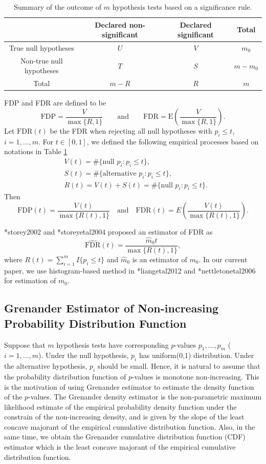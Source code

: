 \documentclass[12pt, letter]{article}\usepackage[]{graphicx}\usepackage[]{color}
\begin{document}
\begin{table}
\centering
\begin{tabular}{|c|cc|c|}
\hline
& Declared non-significant   & Declared significant & Total \\
\hline
True null hypotheses & $U$ & $V$ & $m_0$\\
Non-true null hypotheses & $T$ & $S$ & $m - m_0$\\
\hline
Total & $m-R$ & $R$ & $m$\\
\hline
\end{tabular}
\caption{Summary of the outcome of $m$ hypothesis tests based on a significance rule.}
\label{tab:t1}
\end{table}
FDP and FDR are defined to be
\[
\mbox{FDP} =\frac{V}{\max\{R,1\}}\qquad \mbox{and} \qquad   \mbox{FDR} =\mbox{E}\left(\frac{V}{\max\{R,1\}} \right).
\]
Let $\mbox{FDR}(t)$ be the FDR when rejecting all null hypotheses with $p_i \leq t$,  $i = 1, \dots, m$. For $t\in [0,1]$, we  defined the following empirical processes based on notations in Table \ref{tab:t1}
\begin{align*}
& V(t) = \#\{\mbox{null } p_i : p_i \leq t\},\\
& S(t) = \#\{\mbox{alternative } p_i : p_i \leq t\},\\
& R(t) = V(t) + S(t) =  \#\{\mbox{null } p_i : p_i \leq t\}.
\end{align*}
Then 
\[
\mbox{FDP}(t) = \frac{V(t)}{\max\{R(t), 1\}} \quad \mbox{and} \quad \mbox{FDR}(t) = E\left(\frac{V(t)}{\max\{R(t), 1\}}\right).
\]

\citeasnoun**{storey2002} and \citeasnoun**{storeyetal2004} proposed an estimator of FDR as 
\[
\widehat{\mbox{FDR}}(t) = \frac{\hat{m}_0 t}{\max\{R(t), 1\}},
\]
where $R(t) = \sum_{i = 1}^m I\{p_i \leq t\}$  and $\hat{m}_0$ is an estimator of $m_0$. In our current paper, we use histogram-based method in \citeasnoun**{liangetal2012} and \citeasnoun**{nettletonetal2006} for estimation of $m_0$. 

\subsection{Grenander Estimator of Non-increasing Probability Distribution Function}
Suppose that $m$ hypothesis tests have corresponding $p$-values $p_1, \dots, p_m$ ($i = 1, \dots, m$). Under the null hypothesis, $p_i$ has uniform(0,1) distribution. Under the alternative hypothesis, $p_i$ should be small. Hence, it is natural to assume that the probability distribution function of $p$-values is monotone non-increasing. This is the motivation of using Grenander estimator to estimate the density function of the $p$-values.  The Grenander density estimator \cite{grenander1956} is the non-parametric maximum likelihood estimate of the empirical probability density function under the constrain of the non-increasing density, and  is given by the slope of the least concave majorant  of the empirical cumulative distribution function. Also, in the same time, we obtain the Grenander cumulative distribution function (CDF) estimator which is the least concave majorant of the empirical cumulative distribution function.   
\end{document}
